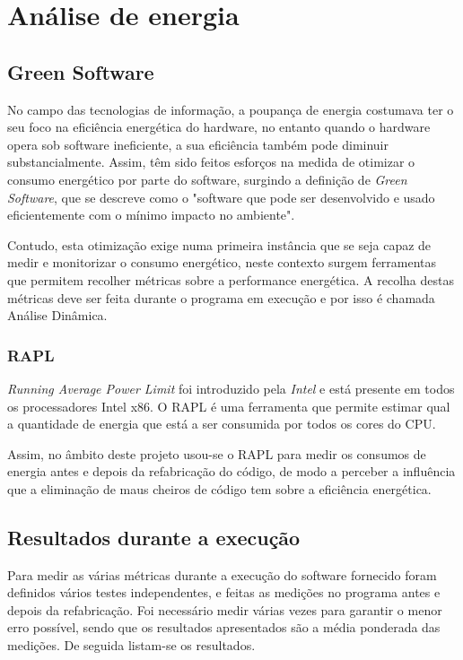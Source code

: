 \chapter{Análise de energia} 


\section{Green Software}
No campo das tecnologias de informação, a poupança de energia costumava ter o seu foco na eficiência energética do hardware, no entanto quando o hardware opera sob software ineficiente, a sua eficiência também pode diminuir substancialmente. Assim, têm sido feitos esforços na medida de otimizar o consumo energético por parte do software, surgindo a definição de \textit{Green Software}, que se descreve como o "software que pode ser desenvolvido e usado eficientemente com o mínimo impacto no ambiente". 

Contudo, esta otimização exige numa primeira instância que se seja capaz de medir e monitorizar o consumo energético, neste contexto surgem ferramentas que permitem  recolher métricas sobre a performance energética. A recolha destas métricas deve ser feita durante o programa em execução e por isso é chamada Análise Dinâmica.   

\subsection{RAPL}
\textit{Running Average Power Limit} foi introduzido pela \textit{Intel} e está presente em todos os processadores Intel x86. O RAPL é uma ferramenta que permite estimar qual a quantidade de energia que está a ser consumida por todos os cores do CPU. 

Assim, no âmbito deste projeto usou-se o RAPL para medir os consumos de energia antes e depois da refabricação do código, de modo a perceber a influência que a eliminação de maus cheiros de código tem sobre a eficiência energética. 

\section{Resultados durante a execução}

Para medir as várias métricas durante a execução do software fornecido foram definidos vários testes independentes, e feitas as medições no programa antes e depois da refabricação. Foi necessário medir várias vezes para garantir o menor erro possível, sendo que os resultados apresentados são a média ponderada das medições. De seguida listam-se os resultados.

